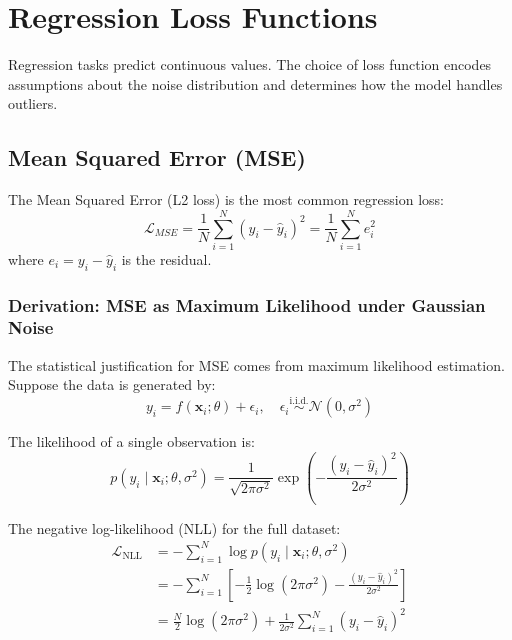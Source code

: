 \section{Regression Loss Functions}

Regression tasks predict continuous values. The choice of loss function encodes assumptions about the noise distribution and determines how the model handles outliers.

\subsection{Mean Squared Error (MSE)}

The Mean Squared Error (L2 loss) is the most common regression loss:
\begin{equation}
\mathcal{L}_{MSE} = \frac{1}{N}\sum_{i=1}^{N} (y_i - \hat{y}_i)^2 = \frac{1}{N}\sum_{i=1}^{N} e_i^2
\end{equation}
where $e_i = y_i - \hat{y}_i$ is the residual.

\subsubsection{Derivation: MSE as Maximum Likelihood under Gaussian Noise}

The statistical justification for MSE comes from maximum likelihood estimation. Suppose the data is generated by:
\begin{equation}
y_i = f(\mathbf{x}_i; \theta) + \epsilon_i, \quad \epsilon_i \overset{\text{i.i.d.}}{\sim} \mathcal{N}(0, \sigma^2)
\end{equation}

The likelihood of a single observation is:
\begin{equation}
p(y_i \mid \mathbf{x}_i; \theta, \sigma^2) = \frac{1}{\sqrt{2\pi\sigma^2}} \exp\left(-\frac{(y_i - \hat{y}_i)^2}{2\sigma^2}\right)
\end{equation}

The negative log-likelihood (NLL) for the full dataset:
\begin{align}
\mathcal{L}_{\text{NLL}} &= -\sum_{i=1}^{N} \log p(y_i \mid \mathbf{x}_i; \theta, \sigma^2) \\
&= -\sum_{i=1}^{N}\left[-\frac{1}{2}\log(2\pi\sigma^2) - \frac{(y_i - \hat{y}_i)^2}{2\sigma^2}\right] \\
&= \frac{N}{2}\log(2\pi\sigma^2) + \frac{1}{2\sigma^2}\sum_{i=1}^{N}(y_i - \hat{y}_i)^2
\end{align}

